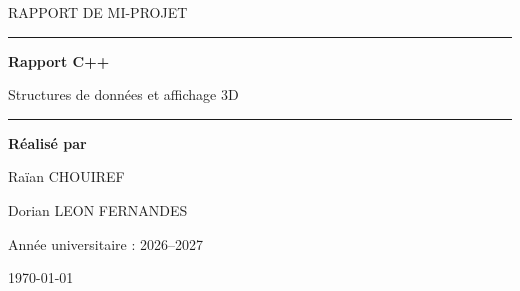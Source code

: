 \documentclass[12pt,a4paper]{article}
\begin{document}
\begin{titlepage}
    \thispagestyle{empty}

    \centering

    \vspace*{2cm}

    {\Large\textcolor{gris}{RAPPORT DE MI-PROJET}\par}

    \vspace{1.5cm}

    {\color{bleufonce}\rule{\textwidth}{1.5pt}\par}

    \vspace{0.7cm}

    {\Huge\bfseries Rapport C++\par}

    \vspace{0.5cm}

    {\Large\textcolor{gris}{Structures de données et affichage 3D}\par}

    \vspace{0.7cm}

    {\color{bleufonce}\rule{\textwidth}{1.5pt}\par}

    \vspace{2.5cm}

    {\large\textbf{Réalisé par}\par}

    \vspace{0.5cm}

    {\Large Raïan CHOUIREF\par}
    \vspace{0.2cm}
    {\Large Dorian LEON FERNANDES\par}

    \vfill

    {\large Année universitaire : 2026--2027\par}

    \vspace{0.5cm}

    {\large \today\par}

    \vspace{1cm}

\end{titlepage}
\end{document}

